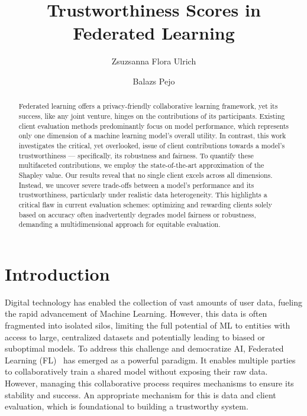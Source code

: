 \documentclass[sigconf]{acmart}
\begin{document}
\title{Trustworthiness Scores in Federated Learning}

 \author{Zsuzsanna Flora Ulrich}

 \author{Balazs Pejo}

\begin{abstract}
Federated learning offers a privacy-friendly collaborative learning framework, yet its success, like any joint venture, hinges on the contributions of its participants. Existing client evaluation methods predominantly focus on model performance, which represents only one dimension of a machine learning model's overall utility. In contrast, this work investigates the critical, yet overlooked, issue of client contributions towards a model's trustworthiness --- specifically, its robustness and fairness. To quantify these multifaceted contributions, we employ the state-of-the-art approximation of the Shapley value. Our results reveal that no single client excels across all dimensions. Instead, we uncover severe trade-offs between a model's performance and its trustworthiness, particularly under realistic data heterogeneity. This highlights a critical flaw in current evaluation schemes: optimizing and rewarding clients solely based on accuracy often inadvertently degrades model fairness or robustness, demanding a multidimensional approach for equitable evaluation.
\end{abstract}


\maketitle

\section{Introduction}

Digital technology has enabled the collection of vast amounts of user data, fueling the rapid advancement of Machine Learning. However, this data is often fragmented into isolated silos, limiting the full potential of ML to entities with access to large, centralized datasets and potentially leading to biased or suboptimal models. To address this challenge and democratize AI, Federated Learning (FL)~\cite{mcmahan2017communication} has emerged as a powerful paradigm. It enables multiple parties to collaboratively train a shared model without exposing their raw data. However, managing this collaborative process requires mechanisms to ensure its stability and success. An appropriate mechanism for this is data and client evaluation, which is foundational to building a trustworthy system.
\end{document}
